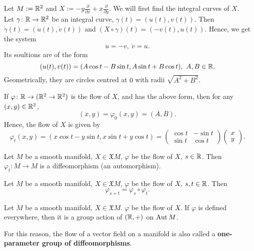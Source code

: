 \begin{example}
  Let $M := \mathbb{R}^2$ and
  $X := - y \frac{\partial}{\partial x} + x \frac{\partial}{\partial y}$.
  We will first find the integral curves of $X$.
  Let $\gamma \colon \mathbb{R} \to \mathbb{R}^2$ be an integral curve,
  $\gamma(t) = (u(t), v(t))$.
  Then $\dot{\gamma}(t) = (\dot{u}(t), \dot{v}(t))$
  and $(X \circ \gamma)(t) = (- v(t), u(t))$.
  Hence, we get the system
  \begin{equation}
    \dot{u} = - v,\ \dot{v} = u.
  \end{equation}
  Its soultions are of the form
  \begin{equation}
    (u(t), v(t)) = (A \cos t - B \sin t, A \sin t + B \cos t),\ A, B \in \mathbb{R}.
  \end{equation}
  Geometrically, they are circles centred at $0$ with radii $\sqrt{A^2 + B^2}$.

  If $\varphi \colon \mathbb{R} \to (\mathbb{R}^2 \to \mathbb{R}^2)$ is the flow of $X$, and has the
  above form, then for any $(x, y) \in \mathbb{R}^2$,
  \begin{equation}
    (x, y) = \varphi_0(x, y) = (A, B).
  \end{equation}
  Hence, the flow of $X$ is given by
  \begin{equation}
    \varphi_t(x, y)
    = (x \cos t - y \sin t, x \sin t + y \cos t)
    =
    \begin{pmatrix}
      \cos t & - \sin t \\
      \sin t & \cos t
    \end{pmatrix}
    \begin{pmatrix}
      x \\
      y
    \end{pmatrix}.
  \end{equation}
\end{example}
\begin{proposition}
  Let
    $M$ be a smooth manifold,
    $X \in \mathfrak{X} M$,
    $\varphi$ be the flow of $X$,
    $s \in \mathbb{R}$.
  Then $\varphi_t \colon M \to M$ is a diffeomorphism (an automorphism).
\end{proposition}
\begin{proposition}
  Let
    $M$ be a smooth manifold,
    $X \in \mathfrak{X} M$,
    $\varphi$ be the flow of $X$,
    $s, t \in \mathbb{R}$.
  Then
  \begin{equation}
    \varphi_{s + t} = \varphi_s \circ \varphi_t.
  \end{equation}
\end{proposition}
\begin{corollary}
  Let
    $M$ be a smooth manifold,
    $X \in \mathfrak{X} M$.
    $\varphi$ be the flow of $X$.
  If $\varphi$ is defined everywhere, then it is a group action of $(\mathbb{R}, +)$ on
  $\mathop{\rm Aut}\nolimits M$.
\end{corollary}
\begin{remark}
  For this reason, the flow of a vector field on a manifold is also called a
  \textbf{one-parameter group of diffeomorphisms}.
\end{remark}
